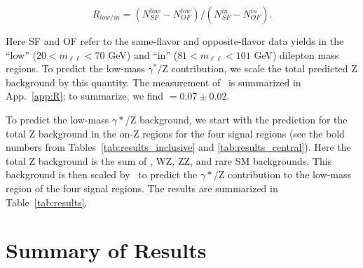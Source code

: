 \begin{equation}
R_{low/in} = (N_{SF}^{low}-N_{OF}^{low})/(N_{SF}^{in}-N_{OF}^{in}).
\end{equation}

Here SF and OF refer to the same-flavor and opposite-flavor data yields in the ``low'' ($20<m_{\ell\ell}<70$ GeV) and ``in'' 
($81<m_{\ell\ell}<101$ GeV) dilepton mass regions. To predict the low-mass $\gamma^*$/Z contribution, we scale the total predicted
Z background by this quantity. The measurement of \rlowin\ is summarized in App.~\ref{app:R}; to summarize, we find \rlowin$=0.07\pm0.02$.

To predict the low-mass $\gamma*$/Z background, we start with the prediction for the total Z background in the on-Z regions for the four signal
regions (see the bold numbers from Tables~\ref{tab:results_inclusive} and \ref{tab:results_central}). Here the total Z background is the sum of \zjets,
WZ, ZZ, and rare SM backgrounds. This background is then scaled by \rlowin\ to predict the $\gamma*$/Z contribution to the low-mass region of the
four signal regions. The results are summarized in Table~\ref{tab:results}.



\section{Summary of Results}
\label{sec:templates_summary}

